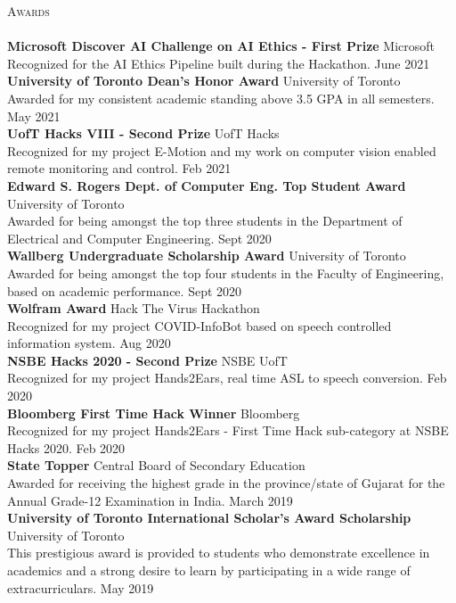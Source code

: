 \documentclass[a4paper]{article}
\newcommand{\lineunder} {
    \vspace*{-8pt} \\
    \hspace*{-18pt} \hrulefill \\
}
\newcommand{\header} [1] {
    {\hspace*{-18pt}\vspace*{6pt} \textsc{#1}}
    \vspace*{-6pt} \lineunder
}
\begin{document}
\header{Awards}
\textbf{Microsoft Discover AI Challenge on AI Ethics - First Prize} \hfill Microsoft\\
Recognized for the AI Ethics Pipeline built during the Hackathon. \hfill June 2021\\
\vspace*{2mm}
\textbf{University of Toronto Dean’s Honor Award} \hfill University of Toronto\\
Awarded for my consistent academic standing above 3.5 GPA in all semesters. \hfill May 2021\\
\vspace*{2mm}
\textbf{UofT Hacks VIII - Second Prize} \hfill UofT Hacks\\
Recognized for my project E-Motion and my work on computer vision enabled remote monitoring and
control. \hfill Feb 2021\\
\vspace*{2mm}
\textbf{Edward S. Rogers Dept. of Computer Eng. Top Student Award} \hfill University of Toronto\\
Awarded for being amongst the top three students in the Department of Electrical and Computer
Engineering. \hfill Sept 2020\\
\vspace*{2mm}
\textbf{Wallberg Undergraduate Scholarship Award} \hfill University of Toronto\\
Awarded for being amongst the top four students in the Faculty of Engineering, based on academic
performance. \hfill Sept 2020\\
\vspace*{2mm}
\textbf{Wolfram Award} \hfill Hack The Virus Hackathon\\
Recognized for my project COVID-InfoBot based on speech controlled information system. \hfill Aug 2020\\
\vspace*{2mm}
\textbf{NSBE Hacks 2020 - Second Prize} \hfill NSBE UofT\\
Recognized for my project Hands2Ears, real time ASL to speech conversion. \hfill Feb 2020\\
\vspace*{2mm}
\textbf{Bloomberg First Time Hack Winner} \hfill Bloomberg\\
Recognized for my project Hands2Ears - \textquotedbl{}First Time Hack\textquotedbl{} sub-category at NSBE Hacks 2020. \hfill Feb 2020\\
\vspace*{2mm}
\textbf{State Topper} \hfill Central Board of Secondary Education\\
Awarded for receiving the highest grade in the province/state of Gujarat for the Annual Grade-12
Examination in India. \hfill March 2019\\
\vspace*{2mm}
\textbf{University of Toronto International Scholar’s Award Scholarship} \hfill University of Toronto\\
This prestigious award is provided to students who demonstrate excellence in academics and a strong desire to learn by participating in a wide range of extracurriculars. \hfill May 2019\\
\end{document}
